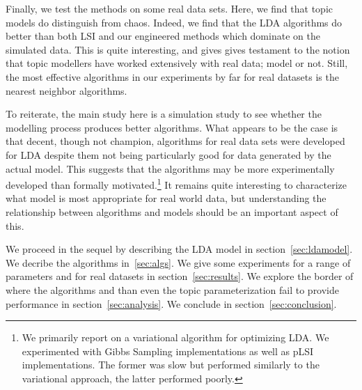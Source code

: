 Finally, we test the methods on some real data sets.  Here, we find
that topic models do distinguish from chaos. Indeed, we find that the
LDA algorithms do better than both LSI and our engineered methods
which dominate on the simulated data.  This is quite interesting, and
gives gives testament to the notion that topic modellers have worked
extensively with real data; model or not.  Still, the most effective
algorithms in our experiments by far for real datasets is the nearest
neighbor algorithms.

To reiterate, the main study here is a simulation study to see whether
the modelling process produces better algorithms.  What appears to be
the case is that decent, though not champion, algorithms for real data
sets were developed for LDA despite them not being particularly good
for data generated by the actual model.  This suggests that the
algorithms may be more experimentally developed than formally
motivated.\footnote{We primarily report on a variational algorithm
for optimizing LDA.  We experimented with Gibbs Sampling
implementations as well as pLSI implementations.  The former was slow
but performed similarly to the variational approach, the latter
performed poorly.}  It remains quite interesting to characterize
what model is most appropriate for real world data, but 
understanding the relationship between algorithms and models
should be an important aspect of this. 

We proceed in the sequel by describing the LDA model in section~\ref{sec:ldamodel}. We decribe
the algorithms in~\ref{sec:algs}. We
give some experiments for a range of parameters and for real datasets in section~\ref{sec:results}.  We
explore the border of where the algorithms and than even the topic
parameterization fail to provide performance in section~\ref{sec:analysis}.   We conclude in section~\ref{sec:conclusion}.





